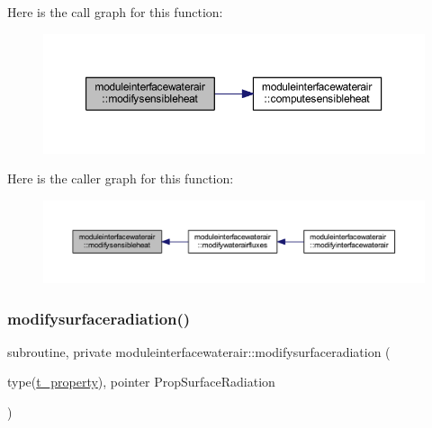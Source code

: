 Here is the call graph for this function\+:\nopagebreak
\begin{figure}[H]
\begin{center}
\leavevmode
\includegraphics[width=350pt]{namespacemoduleinterfacewaterair_a2724f68137207e7ade1ca13b482d8f81_cgraph}
\end{center}
\end{figure}
Here is the caller graph for this function\+:\nopagebreak
\begin{figure}[H]
\begin{center}
\leavevmode
\includegraphics[width=350pt]{namespacemoduleinterfacewaterair_a2724f68137207e7ade1ca13b482d8f81_icgraph}
\end{center}
\end{figure}
\mbox{\label{namespacemoduleinterfacewaterair_a57d8dae2ec14a4562c48bbccb24a5f96}} 
\subsubsection{\texorpdfstring{modifysurfaceradiation()}{modifysurfaceradiation()}}
{\footnotesize\ttfamily subroutine, private moduleinterfacewaterair\+::modifysurfaceradiation (\begin{DoxyParamCaption}\item[{type(\mbox{\hyperlink{structmoduleinterfacewaterair_1_1t__property}{t\+\_\+property}}), pointer}]{Prop\+Surface\+Radiation }\end{DoxyParamCaption})\hspace{0.3cm}{\ttfamily [private]}}


